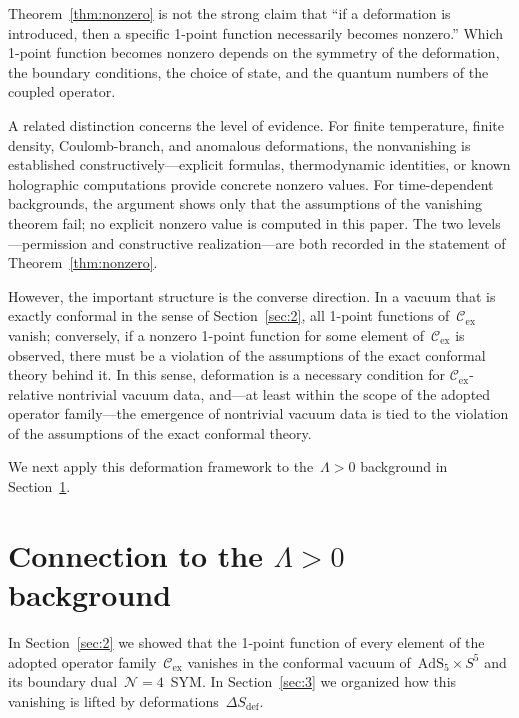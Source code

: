 \documentclass[
  aps,
  prd,
  preprint,
  groupedaddress,
  nofootinbib,
  longbibliography
]{revtex4-2}
\theoremstyle{remark}
\newcommand{\Cex}{\mathcal{C}_{\mathrm{ex}}}
\newcommand{\N}{\mathcal{N}}
\newcommand{\AdS}{\mathrm{AdS}}
\begin{document}
Theorem~\ref{thm:nonzero} is not the strong claim that
``if a deformation is introduced, then a specific 1-point function
necessarily becomes nonzero.''
Which 1-point function becomes nonzero depends on the symmetry
of the deformation, the boundary conditions, the choice of
state, and the quantum numbers of the coupled operator.

A related distinction concerns the level of evidence.
For finite temperature, finite density, Coulomb-branch,
and anomalous deformations, the nonvanishing is established
constructively---explicit formulas, thermodynamic identities,
or known holographic computations provide concrete nonzero
values.
For time-dependent backgrounds, the argument shows only that the
assumptions of the vanishing theorem fail; no explicit nonzero
value is computed in this paper.
The two levels---permission and constructive realization---are
both recorded in the statement of
Theorem~\ref{thm:nonzero}.

However, the important structure is the converse direction.
In a vacuum that is exactly conformal in the sense of
Section~\ref{sec:2}, all 1-point functions of~$\Cex$ vanish;
conversely, if a nonzero 1-point function for some element
of~$\Cex$ is observed, there must be a violation of the
assumptions of the exact conformal theory behind it.
In this sense, deformation is a necessary condition for
$\Cex$-relative nontrivial vacuum data, and---at least within the
scope of the adopted operator family---the emergence of nontrivial
vacuum data is tied to the violation of the assumptions of the
exact conformal theory.

We next apply this deformation framework to the~$\Lambda>0$
background in Section~\ref{sec:4}.

\section{Connection to the \texorpdfstring{$\Lambda>0$}{Lambda>0} background}%
  \label{sec:4}

In Section~\ref{sec:2} we showed that the 1-point function of every
element of the adopted operator family~$\Cex$ vanishes in the
conformal vacuum of~$\AdS_5\times S^5$ and its boundary
dual~$\N=4$~SYM\@.
In Section~\ref{sec:3} we organized how
this vanishing is lifted by deformations~$\Delta S_{\mathrm{def}}$.
\end{document}
